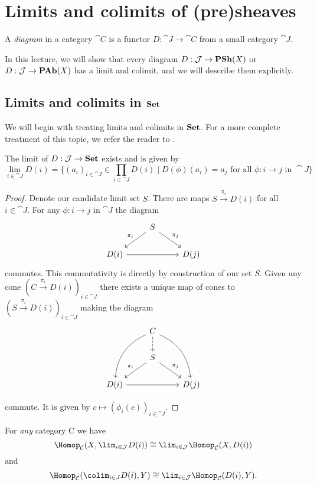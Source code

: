 \documentclass[../main.tex]{subfiles}
\begin{document}
\chapter{Limits and colimits of (pre)sheaves}
\begin{defn}
    A \emph{diagram} in a category $\cat C$ is a functor $D: \cat J \to \cat C$ from a small category $\cat J$. 
\end{defn}

In this lecture, we will show that every diagram $D: \mathcal{J} \to \operatorname{\mathbf{PSh}}(X)$ or $D: \mathcal{J} \to \operatorname{\mathbf{PAb}}(X)$ has a limit and colimit, and we will describe them explicitly.

\section{Limits and colimits in $\mathbf{Set}$}

We will begin with treating limits and colimits in $\mathbf{Set}$. For a more complete treatment of this topic, we refer the reader to \cite[Chapter~3.2]{riehlCategoryTheoryContext2016}.
\begin{prop}
    The limit of $D: \mathcal{J} \to \mathbf{Set}$ exists and is given by \[
        \lim_{i\in \cat J}D(i) = \{(a_i)_{i \in \cat J} \in \prod_{i \in \cat J}D(i) \mid D(\phi)(a_i) = a_j \text{ for all } \phi: i \to j \text{ in } \cat J\}
    \]
\end{prop}
\begin{proof}
	Denote our candidate limit set $S$. There are maps $S \xrightarrow{\pi_i} D(i)$ for all $i \in \cat J$. For any $\phi: i \to j$ in $\cat J$ the diagram 
    \[
      \begin{tikzcd}
                & S \arrow[ld, "\pi_i"'] \arrow[rd, "\pi_j"] &      \\
D(i) \arrow[rr] &                                            & D(j)
\end{tikzcd}  
    \]
commutes. This commutativity is directly by construction of our set $S$. Given any cone $(C \xrightarrow{\pi_i} D(i))_{i \in \cat J}$ there exists a unique map of cones to $(S \xrightarrow{\pi_i} D(i))_{i \in \cat J}$ making the diagram 
\[

\begin{tikzcd}
                & C \arrow[ldd, bend right] \arrow[rdd, bend left] \arrow[d, dashed] &      \\
                & S \arrow[ld, "\pi_i"'] \arrow[rd, "\pi_j"]                         &      \\
D(i) \arrow[rr] &                                                                    & D(j)
\end{tikzcd}\]

commute. It is given by $c \mapsto (\phi_i(c))_{i \in \cat J}$.

\end{proof}

\begin{cor}
	For \emph{any} category \cat C we have 
    \[
        \Hom_{\cat C}(X, \lim_{i \in \cat J}D(i)) \cong \lim_{i \in \cat J} \Hom_{\cat C}(X, D(i))
    \] and 
    \[
         \Hom_{\cat C}(\colim_{i \in J} D(i), Y) \cong \lim_{i \in \cat J} \Hom_{\cat C}(D(i), Y).   
    \]
\end{cor}
\end{document}
